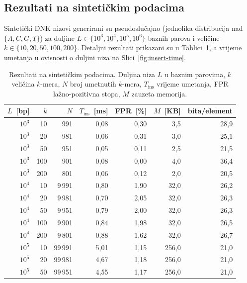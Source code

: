 \documentclass[12pt,a4paper]{article}
\begin{document}
\subsection{Rezultati na sintetičkim podacima}
Sintetički DNK nizovi generirani su pseudoslučajno (jednolika distribucija nad
$\{A, C, G, T\}$) za duljine $L \in \{10^3, 10^4, 10^5, 10^6\}$ baznih parova i
veličine $k \in \{10, 20, 50, 100, 200\}$. Detaljni rezultati prikazani su u
Tablici~\ref{tab:synthetic}, a vrijeme umetanja u ovisnosti o duljini niza na
Slici~\ref{fig:insert-time}.

\begin{table}[H]
    \centering
    \caption{Rezultati na sintetičkim podacima. Duljina niza $L$ u baznim parovima,
    $k$ veličina $k$-mera, $N$ broj umetnutih $k$-mera, $T_\text{ins}$ vrijeme
    umetanja, FPR lažno-pozitivna stopa, $M$ zauzeta memorija.}
    \label{tab:synthetic}
    \footnotesize
    \begin{tabular}{r r r r r r r}
        \toprule
        $L$~[bp] & $k$ & $N$ & $T_\text{ins}$~[ms] & FPR~[\%] & $M$~[KB] & bita/element \\
        \midrule
        $10^3$ & 10  & 991    & 0{,}08    & 0{,}30 & 3{,}5   & 28{,}9 \\
        $10^3$ & 20  & 981    & 0{,}06    & 0{,}31 & 3{,}0   & 25{,}1 \\
        $10^3$ & 50  & 951    & 0{,}05    & 0{,}11 & 2{,}5   & 21{,}5 \\
        $10^3$ & 100 & 901    & 0{,}08    & 0{,}00 & 4{,}0   & 36{,}4 \\
        $10^3$ & 200 & 801    & 0{,}06    & 0{,}12 & 2{,}0   & 20{,}5 \\
        \midrule
        $10^4$ & 10  & 9\,991  & 0{,}80    & 1{,}90 & 32{,}0  & 26{,}2 \\
        $10^4$ & 20  & 9\,981  & 0{,}70    & 2{,}05 & 32{,}0  & 26{,}3 \\
        $10^4$ & 50  & 9\,951  & 0{,}79    & 2{,}00 & 32{,}0  & 26{,}3 \\
        $10^4$ & 100 & 9\,901  & 0{,}84    & 1{,}98 & 32{,}0  & 26{,}5 \\
        $10^4$ & 200 & 9\,801  & 0{,}88    & 1{,}62 & 32{,}0  & 26{,}7 \\
        \midrule
        $10^5$ & 10  & 99\,991 & 5{,}01    & 1{,}15 & 256{,}0 & 21{,}0 \\
        $10^5$ & 20  & 99\,981 & 4{,}67    & 1{,}18 & 256{,}0 & 21{,}0 \\
        $10^5$ & 50  & 99\,951 & 4{,}55    & 1{,}17 & 256{,}0 & 21{,}0 \\

\end{tabular}
\end{table}
\end{document}
